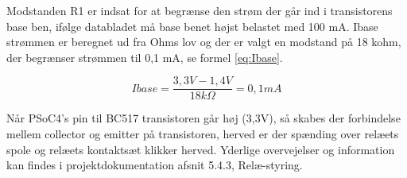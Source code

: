 Modstanden R1 er indsat for at begrænse den strøm der går ind i transistorens base ben, ifølge databladet må base benet højst belastet med 100 mA. Ibase strømmen er beregnet ud fra Ohms lov og der er valgt en modstand på 18 kohm, der begrænser strømmen til 0,1 mA, se formel \ref{eq:Ibase}.

\begin{equation} 
Ibase = \frac{3,3V - 1,4V}{18k\Omega} = 0,1mA
\label{eq:Ibase}
\end{equation} 

Når PSoC4’s pin til BC517 transistoren går høj (3,3V), så skabes der forbindelse mellem collector og emitter på transistoren, herved er der spænding over relæets spole og relæets kontaktsæt klikker herved. Yderlige overvejelser og information kan findes i projektdokumentation afsnit 5.4.3, Relæ-styring.




